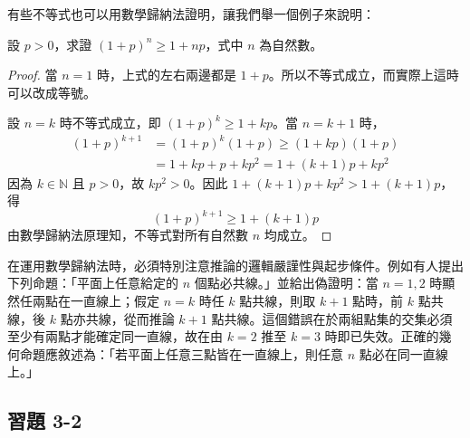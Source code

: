 有些不等式也可以用數學歸納法證明，讓我們舉一個例子來說明：

\begin{example}[伯努利不等式]\label{ex:bernoulli}
設 $p > 0$，求證 $(1+p)^n \ge 1+np$，式中 $n$ 為自然數。
\end{example}

\begin{proof}
當 $n=1$ 時，上式的左右兩邊都是 $1+p$。所以不等式成立，而實際上這時可以改成等號。

設 $n=k$ 時不等式成立，即 $(1+p)^k \ge 1+kp$。當 $n=k+1$ 時，
\begin{align*}
  (1+p)^{k+1} &= (1+p)^k (1+p) \ge (1+kp)(1+p) \\
  &= 1 + kp + p + kp^2 = 1 + (k+1)p + kp^2
\end{align*}
因為 $k \in \mathbb{N}$ 且 $p > 0$，故 $kp^2 > 0$。因此 $1 + (k+1)p + kp^2 > 1 + (k+1)p$，得
\begin{equation*}
  (1+p)^{k+1} \ge 1 + (k+1)p
\end{equation*}
由數學歸納法原理知，不等式對所有自然數 $n$ 均成立。
\end{proof}

\begin{example}\label{ex:collinear_fallacy}
在運用數學歸納法時，必須特別注意推論的邏輯嚴謹性與起步條件。例如有人提出下列命題：「平面上任意給定的 $n$ 個點必共線。」並給出偽證明：當 $n=1, 2$ 時顯然任兩點在一直線上；假定 $n=k$ 時任 $k$ 點共線，則取 $k+1$ 點時，前 $k$ 點共線，後 $k$ 點亦共線，從而推論 $k+1$ 點共線。這個錯誤在於兩組點集的交集必須至少有兩點才能確定同一直線，故在由 $k=2$ 推至 $k=3$ 時即已失效。正確的幾何命題應敘述為：「若平面上任意三點皆在一直線上，則任意 $n$ 點必在同一直線上。」
\end{example}

\subsection*{習題 3-2}\label{sec:ex3-2}

